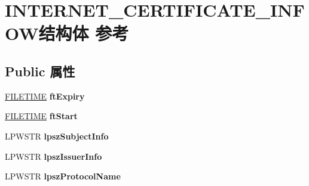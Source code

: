\hypertarget{struct_i_n_t_e_r_n_e_t___c_e_r_t_i_f_i_c_a_t_e___i_n_f_o_w}{}\section{I\+N\+T\+E\+R\+N\+E\+T\+\_\+\+C\+E\+R\+T\+I\+F\+I\+C\+A\+T\+E\+\_\+\+I\+N\+F\+O\+W结构体 参考}
\label{struct_i_n_t_e_r_n_e_t___c_e_r_t_i_f_i_c_a_t_e___i_n_f_o_w}
\subsection*{Public 属性}
\begin{DoxyCompactItemize}
\item 
\mbox{\label{struct_i_n_t_e_r_n_e_t___c_e_r_t_i_f_i_c_a_t_e___i_n_f_o_w_a2ea3ebd4ab631a0ceacea4d437fe39fd}} 
\hyperlink{struct___f_i_l_e_t_i_m_e}{F\+I\+L\+E\+T\+I\+ME} {\bfseries ft\+Expiry}
\item 
\mbox{\label{struct_i_n_t_e_r_n_e_t___c_e_r_t_i_f_i_c_a_t_e___i_n_f_o_w_a0d38d658f33e6388bf11808d355317a2}} 
\hyperlink{struct___f_i_l_e_t_i_m_e}{F\+I\+L\+E\+T\+I\+ME} {\bfseries ft\+Start}
\item 
\mbox{\label{struct_i_n_t_e_r_n_e_t___c_e_r_t_i_f_i_c_a_t_e___i_n_f_o_w_a3b661af93ed459bdecb3d143c90b753c}} 
L\+P\+W\+S\+TR {\bfseries lpsz\+Subject\+Info}
\item 
\mbox{\label{struct_i_n_t_e_r_n_e_t___c_e_r_t_i_f_i_c_a_t_e___i_n_f_o_w_ac2718e03f44872d5686fb67463adbaa2}} 
L\+P\+W\+S\+TR {\bfseries lpsz\+Issuer\+Info}
\item 
\mbox{\label{struct_i_n_t_e_r_n_e_t___c_e_r_t_i_f_i_c_a_t_e___i_n_f_o_w_a1e3a09e42081c7ba59c1139fa0e513ad}} 
L\+P\+W\+S\+TR {\bfseries lpsz\+Protocol\+Name}
\item 
\mbox{\label{struct_i_n_t_e_r_n_e_t___c_e_r_t_i_f_i_c_a_t_e___i_n_f_o_w_a2f5c37c464a5d846f35aa98c325f5507}} 

\end{DoxyCompactItemize}
